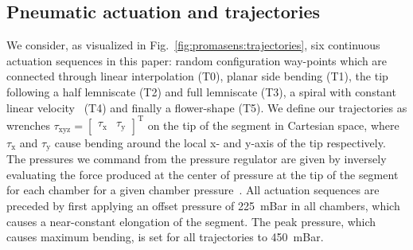 \subsection{Pneumatic actuation and trajectories}
We consider, as visualized in Fig.~\ref{fig:promasens:trajectories}, six continuous actuation sequences in this paper: random configuration way-points which are connected through linear interpolation (T0), planar side bending (T1), the tip following a half lemniscate (T2) and full lemniscate (T3), a spiral with constant linear velocity~\cite{carrasco2018constant} (T4) and finally a flower-shape (T5).
We define our trajectories as wrenches  $\tau_\mathrm{xyz} = \begin{bmatrix} \tau_\mathrm{x} & \tau_\mathrm{y} \end{bmatrix}^\mathrm{T}$ on the tip of the segment in Cartesian space, where $\tau_\mathrm{x}$ and $\tau_\mathrm{y}$ cause bending around the local x- and y-axis  of the tip respectively. %
The pressures we command from the pressure regulator are given by inversely evaluating the force produced at the center of pressure at the tip of the segment for each chamber for a given chamber pressure~\cite{della2019dynamic}.
All actuation sequences are preceded by first applying an offset pressure of \SI{225}{mBar} in all chambers, which causes a near-constant elongation of the segment. The peak pressure, which causes maximum bending, is set for all trajectories to \SI{450}{mBar}.



